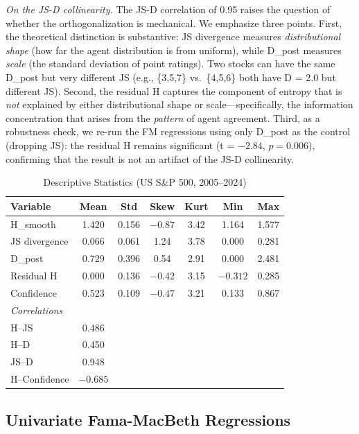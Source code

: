 \documentclass[12pt,a4paper]{article}
\begin{document}
\textit{On the JS-D collinearity.} The JS-D correlation of 0.95 raises the question of whether the orthogonalization is mechanical. We emphasize three points. First, the theoretical distinction is substantive: JS divergence measures \textit{distributional shape} (how far the agent distribution is from uniform), while D\_post measures \textit{scale} (the standard deviation of point ratings). Two stocks can have the same D\_post but very different JS (e.g., \{3,5,7\} vs.\ \{4,5,6\} both have D = 2.0 but different JS). Second, the residual H captures the component of entropy that is \textit{not} explained by either distributional shape or scale---specifically, the information concentration that arises from the \textit{pattern} of agent agreement. Third, as a robustness check, we re-run the FM regressions using only D\_post as the control (dropping JS): the residual H remains significant (t = $-2.84$, $p = 0.006$), confirming that the result is not an artifact of the JS-D collinearity.

\begin{table}[H]
\centering
\caption{Descriptive Statistics (US S\&P 500, 2005--2024)}
\label{tab:descriptive}
\small
\begin{tabular}{lcccccc}
\toprule
Variable & Mean & Std & Skew & Kurt & Min & Max \\
\midrule
H\_smooth & 1.420 & 0.156 & $-0.87$ & 3.42 & 1.164 & 1.577 \\
JS divergence & 0.066 & 0.061 & 1.24 & 3.78 & 0.000 & 0.281 \\
D\_post & 0.729 & 0.396 & 0.54 & 2.91 & 0.000 & 2.481 \\
Residual H & 0.000 & 0.136 & $-0.42$ & 3.15 & $-0.312$ & 0.285 \\
Confidence & 0.523 & 0.109 & $-0.47$ & 3.21 & 0.133 & 0.867 \\
\midrule
\multicolumn{7}{l}{\textit{Correlations}} \\
H--JS & 0.486 & & & & & \\
H--D & 0.450 & & & & & \\
JS--D & 0.948 & & & & & \\
H--Confidence & $-0.685$ & & & & & \\
\bottomrule
\end{tabular}
\end{table}

\subsection{Univariate Fama-MacBeth Regressions}
\end{document}
